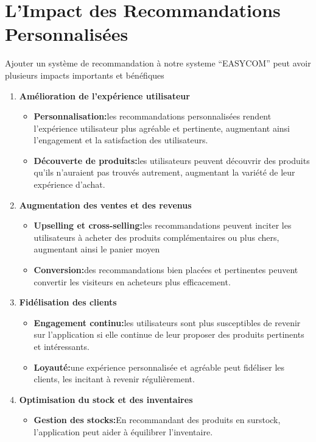 \documentclass[edit,12pt,a4paper,ChapStyle,oneside,doubleinterligne]{report}
\begin{document}
\section{L'Impact des Recommandations Personnalisées}
Ajouter un système de recommandation à notre systeme “EASYCOM” peut avoir plusieurs impacts importants et bénéfiques
\begin{enumerate}
    \item \textbf{Amélioration de l'expérience utilisateur} \begin{itemize}
             \item \textbf{Personnalisation:}les recommandations personnalisées rendent l'expérience utilisateur plus agréable et pertinente, augmentant ainsi l'engagement et la satisfaction des utilisateurs.
             \item \textbf{Découverte de produits:}les utilisateurs peuvent découvrir des produits qu'ils n'auraient pas trouvés autrement, augmentant la variété de leur expérience d'achat.
            \end{itemize}
    \item \textbf{Augmentation des ventes et des revenus} \begin{itemize}
        \item \textbf{Upselling et cross-selling:}les recommandations peuvent inciter les utilisateurs à acheter des produits complémentaires ou plus chers, augmentant ainsi le panier moyen
        \item \textbf{Conversion:}des recommandations bien placées et pertinentes peuvent convertir les visiteurs en acheteurs plus efficacement.
    \end{itemize}
    \item \textbf{Fidélisation des clients} \begin{itemize}
        \item \textbf{Engagement continu:}les utilisateurs sont plus susceptibles de revenir sur l'application si elle continue de leur proposer des produits pertinents et intéressants.
        \item \textbf{Loyauté:}une expérience personnalisée et agréable peut fidéliser les clients, les incitant à revenir régulièrement.
    \end{itemize}
    \item \textbf{Optimisation du stock et des inventaires} \begin{itemize}
        \item \textbf{Gestion des stocks:}En recommandant des produits en surstock, l'application peut aider à équilibrer l'inventaire.

\end{itemize}
\end{enumerate}
\end{document}
